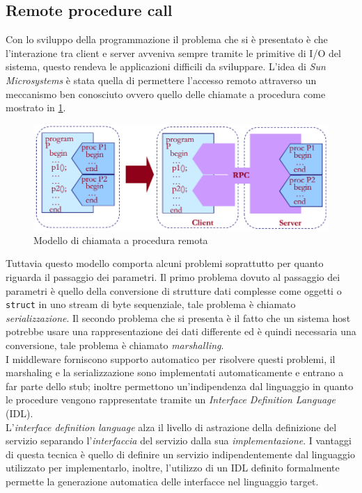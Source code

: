 \subsection{Remote procedure call}
Con lo sviluppo della programmazione il problema che si è presentato è che l'interazione tra client e server avveniva sempre tramite le primitive di I/O del sistema, questo rendeva le applicazioni difficili da sviluppare. L'idea di \emph{Sun Microsystems} è stata quella di permettere l'accesso remoto attraverso un meccanismo ben conosciuto ovvero quello delle chiamate a procedura come mostrato in \figurename \ref{fig:rpc}.
\begin{figure}[tb]
\centering
\includegraphics[width=0.7\linewidth]{img/rpc}
\caption{Modello di chiamata a procedura remota}
\label{fig:rpc}
\end{figure}
Tuttavia questo modello comporta alcuni problemi soprattutto per quanto riguarda il passaggio dei parametri. Il primo problema dovuto al passaggio dei parametri è quello della conversione di strutture dati complesse come oggetti o \texttt{struct} in uno stream di byte sequenziale, tale problema è chiamato \emph{serializzazione}. Il secondo problema che si presenta è il fatto che un sistema host potrebbe usare una rappresentazione dei dati differente ed è quindi necessaria una conversione, tale problema è chiamato \emph{marshalling}.\\
I middleware forniscono supporto automatico per risolvere questi problemi, il marshaling e la serializzazione sono implementati automaticamente e entrano a far parte dello stub; inoltre permettono un'indipendenza dal linguaggio in quanto le procedure vengono rappresentate tramite un \emph{Interface Definition Language} (IDL).\\
L'\emph{interface definition language} alza il livello di astrazione della definizione del servizio separando l'\emph{interfaccia} del servizio dalla sua \emph{implementazione}. I vantaggi di questa tecnica è quello di definire un servizio indipendentemente dal linguaggio utilizzato per implementarlo, inoltre, l'utilizzo di un IDL definito formalmente permette la generazione automatica delle interfacce nel linguaggio target.\\
